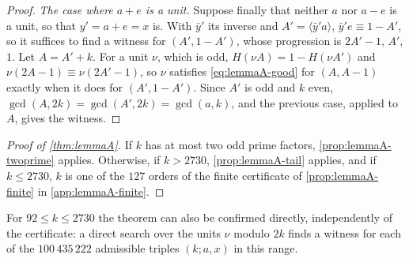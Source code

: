 \begin{proof}
\emph{The case where $a+e$ is a unit.} Suppose finally that neither $a$ nor
$a-e$ is a unit, so that $y'=a+e=x$ is. With $\bar y'$ its inverse and
$A'=\langle\bar y'a\rangle$, $\bar y'e\equiv1-A'$, so it suffices to find a
witness for $(A',1-A')$, whose progression is $2A'-1$, $A'$, $1$. Let
$A=A'+k$. For a unit $\nu$, which is odd, $H(\nu A)=1-H(\nu A')$ and
$\nu(2A-1)\equiv\nu(2A'-1)$, so $\nu$ satisfies \eqref{eq:lemmaA-good} for
$(A,A-1)$ exactly when it does for $(A',1-A')$. Since $A'$ is odd and $k$
even, $\gcd(A,2k)=\gcd(A',2k)=\gcd(a,k)$, and the previous case, applied to
$A$, gives the witness.
\end{proof}

\begin{proof}[Proof of \autoref{thm:lemmaA}]
If $k$ has at most two odd prime factors, \autoref{prop:lemmaA-twoprime}
applies. Otherwise, if $k>2730$, \autoref{prop:lemmaA-tail} applies, and if
$k\le2730$, $k$ is one of the $127$ orders of the finite certificate of
\autoref{prop:lemmaA-finite} in \autoref{app:lemmaA-finite}.
\end{proof}

For $92\le k\le2730$ the theorem can also be confirmed directly, independently
of the certificate: a direct search over the units $\nu$ modulo $2k$ finds a
witness for each of the $100\,435\,222$ admissible triples $(k;a,x)$ in this
range.
